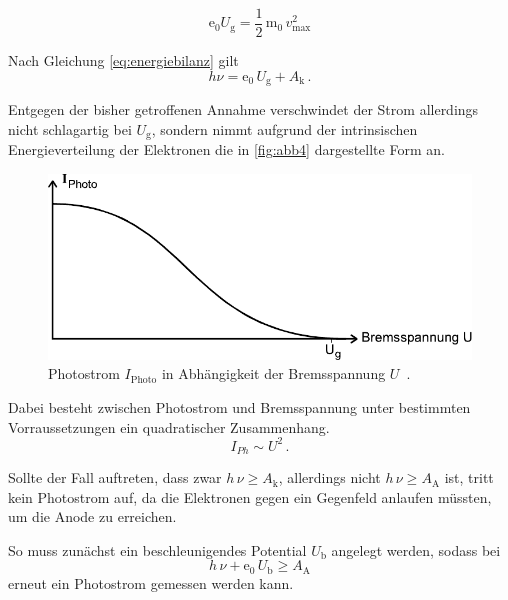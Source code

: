 \begin{equation*}
    \text{e}_0 U_\text{g} = \dfrac{1}{2} \, \text{m}_0 \, v^2_\text{max}
\end{equation*}


Nach Gleichung \eqref{eq:energiebilanz} gilt
\begin{equation*}
    h \nu = \text{e}_0 \,U_\text{g} + A_\text{k} \,.
\end{equation*}

Entgegen der bisher getroffenen Annahme verschwindet der Strom allerdings nicht schlagartig bei $U_\text{g}$, sondern nimmt aufgrund der intrinsischen Energieverteilung der Elektronen die in \autoref{fig:abb4}
dargestellte Form an.

\begin{figure}[H]
    \centering
    \includegraphics{figures/Abb4.pdf}
    \caption{Photostrom $I_\text{Photo}$ in Abhängigkeit der Bremsspannung $U$ \,\cite{ap10}.}
    \label{fig:abb4}
\end{figure}

Dabei besteht zwischen Photostrom und Bremsspannung unter bestimmten Vorraussetzungen ein quadratischer Zusammenhang.
\begin{equation*}
    I_{Ph} \sim U^2 \,.
\end{equation*}

Sollte der Fall auftreten, dass zwar $h \, \nu \geq A_\text{k}$, allerdings nicht $h \, \nu \geq A_\text{A}$ ist, tritt kein Photostrom auf, da die Elektronen gegen ein Gegenfeld anlaufen müssten,
um die Anode zu erreichen.


So muss zunächst ein beschleunigendes Potential $U_\text{b}$ angelegt werden, sodass bei
\begin{equation*}
    h \, \nu + \text{e}_0 \, U_\text{b} \geq A_\text{A}
\end{equation*}
erneut ein Photostrom gemessen werden kann.


